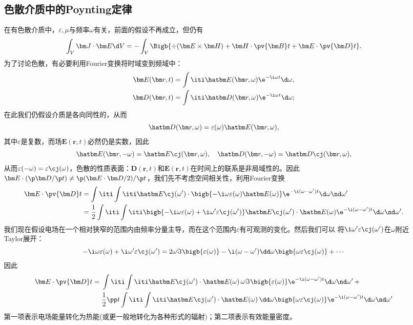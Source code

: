 \subsection{色散介质中的Poynting定律}
\label{ssec:Poynting in dissipative media}
在有色散介质中，$\varepsilon,\mu$与频率$\omega$有关，前面的假设不再成立，但仍有
\[
    \int_V\bm J\cdot\bm E\d V=-\int_V\Bigb{\div(\bm E\times\bm H)+\bm H\cdot\pv{\bm B}t+\bm E\cdot\pv{\bm D}t}.
\]
为了讨论色散，有必要利用Fourier变换将时域变到频域中：
\begin{align*}
    \bm E(\bm r,t)&=\int\iti\hatbm E(\bm r,\omega)\e^{-\i\omega t}\d\omega,\\
    \bm D(\bm r,t)&=\int\iti\hatbm D(\bm r,\omega)\e^{-\i\omega t}\d\omega;
\end{align*}
在此我们仍假设介质是各向同性的，从而
\[
    \hatbm D(\bm r,\omega)=\varepsilon(\omega)\hatbm E(\bm r,\omega),
\]
其中$\varepsilon$是复数，而场$\bm E(\bm r,t)$必然仍是实数，因此%
\[
    \hatbm E(\bm r,-\omega)=\hatbm E\cj(\bm r,\omega),\quad\hatbm D(\bm r,-\omega)=\hatbm D\cj(\bm r,\omega),
\]
从而$\varepsilon(-\omega)=\varepsilon\cj(\omega)$，色散的性质表面：$\bm D(\bm r,t)$和$\bm E(\bm r,t)$在时间上的联系是非局域性的。因此$\bm E\cdot(\p\bm D/\p t)\neq\p(\bm E\cdot\bm D/2)/\p t$，我们先不考虑空间相关性，利用Fourier变换
\begin{align*}
    \bm E\cdot\pv{\bm D}t&=\int\iti\int\iti\hatbm E\cj(\omega')\cdot\bigb{-\i\omega\varepsilon(\omega)\hatbm E(\omega)}\e^{-\i(\omega-\omega')t}\d\omega\nd\omega'\\
    &=\frac12\int\iti\int\iti\bigb{-\i\omega\varepsilon(\omega)+\i\omega'\varepsilon\cj(\omega')}\hatbm E\cj(\omega')\cdot\hatbm E(\omega)\e^{-\i(\omega-\omega')t}\d\omega\nd\omega'.
\end{align*}
我们现在假设电场在一个相对狭窄的范围内由频率分量主导，而在这个范围内$\varepsilon$有可观测的变化。然后我们可以%
将$\i\omega'\varepsilon\cj(\omega')$在$\omega$附近Taylor展开：
\[
    -\i\omega\varepsilon(\omega)+\i\omega'\varepsilon\cj(\omega')=2\omega\Im\bigb{\varepsilon(\omega)}-\i(\omega-\omega')\dd\omega\bigb{\omega\varepsilon\cj(\omega)}+\cdots
\]
因此 
\begin{align*}
    \bm E\cdot\pv{\bm D}t={}&\int\iti\int\iti\hatbm E\cj(\omega')\cdot\hatbm E(\omega)\,\omega\Im\bigb{\varepsilon(\omega)}\e^{-\i(\omega-\omega')t}\d\omega\nd\omega'\,+\\
    &\frac12\pp t\int\iti\int\iti\hatbm E\cj(\omega')\cdot\hatbm E(\omega)\,\dd\omega\bigb{\omega\varepsilon\cj(\omega)}\e^{-\i(\omega-\omega')t}\d\omega\nd\omega'
\end{align*}
第一项表示电场能量转化为热能(或更一般地转化为各种形式的辐射)；第二项表示有效能量密度。

